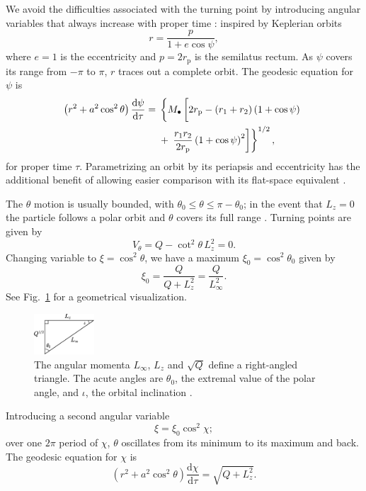 \documentclass[useAMS,usedcolumn,usegraphicx,usenatbib]{mn2e}
\newcommand{\figref}[1]{Fig.~\ref{fig:#1}}
\newcommand{\sub}[1]{\ensuremath{_\mathrm{#1}}}
\newcommand{\dd}{\ensuremath{\mathrm{d}}}
\newcommand{\diff}[2]{\ensuremath{\frac{\dd {#1}}{\dd {#2}}}}
\begin{document}
We avoid the difficulties associated with the turning point by introducing angular variables that always increase with proper time \citep{Drasco2004}: inspired by Keplerian orbits
\begin{equation}
r = \frac{p}{1+e\cos\psi},
\end{equation}
where $e = 1$ is the eccentricity and $p = 2r\sub{p}$ is the semilatus rectum. As $\psi$ covers its range from $-\pi$ to $\pi$, $r$ traces out a complete orbit. The geodesic equation for $\psi$ is
\begin{align}
\left(r^2 + a^2\cos^2\theta\right)\diff{\psi}{\tau} = {} & \left\{M_\bullet\left[2r\sub{p} - \left(r_1 + r_2\right)\left(1 + \cos\psi\right) \vphantom{\frac{r_1 r_2}{2r\sub{p}}} \right.\right. \nonumber \\*
 {} & + \left.\left. \frac{r_1 r_2}{2r\sub{p}}\left(1 + \cos\psi\right)^2\right]\right\}^{1/2},
\end{align}
for proper time $\tau$. Parametrizing an orbit by its periapsis and eccentricity has the additional benefit of allowing easier comparison with its flat-space equivalent \citep*{Gair2005}.

The $\theta$ motion is usually bounded, with $\theta_0 \leq \theta \leq \pi - \theta_0$; in the event that $L_z = 0$ the particle follows a polar orbit and $\theta$ covers its full range \citep{Wilkins1972}. Turning points are given by
\begin{equation}
V_\theta = Q - \cot^2\theta\, L_z^2 = 0.
\end{equation}
Changing variable to $\xi = \cos^2\theta$, we have a maximum $\xi_0 = \cos^2\theta_0$ given by
\begin{equation}
\xi_0 = \frac{Q}{Q+L_z^2} = \frac{Q}{L_\infty^2}.
\label{eq:theta_0}
\end{equation}
See \figref{L_triangle} for a geometrical visualization.
\begin{figure}
\begin{center}
\includegraphics[width=0.2\textwidth]{Triangle.eps}
    \caption{The angular momenta $L_\infty$, $L_z$ and $\sqrt{Q}$ define a right-angled triangle. The acute angles are $\theta_0$, the extremal value of the polar angle, and $\iota$, the orbital inclination \citep*{Glampedakis2002}.}
   \label{fig:L_triangle}
\end{center}
\end{figure}
Introducing a second angular variable \citep{Drasco2004}
\begin{equation}
\xi = \xi_0\cos^2\chi;
\end{equation}
over one $2\pi$ period of $\chi$, $\theta$ oscillates from its minimum to its maximum and back. The geodesic equation for $\chi$ is
\begin{equation}
\left(r^2 + a^2\cos^2\theta\right)\diff{\chi}{\tau} = \sqrt{Q + L_z^2}.
\end{equation}
\end{document}
